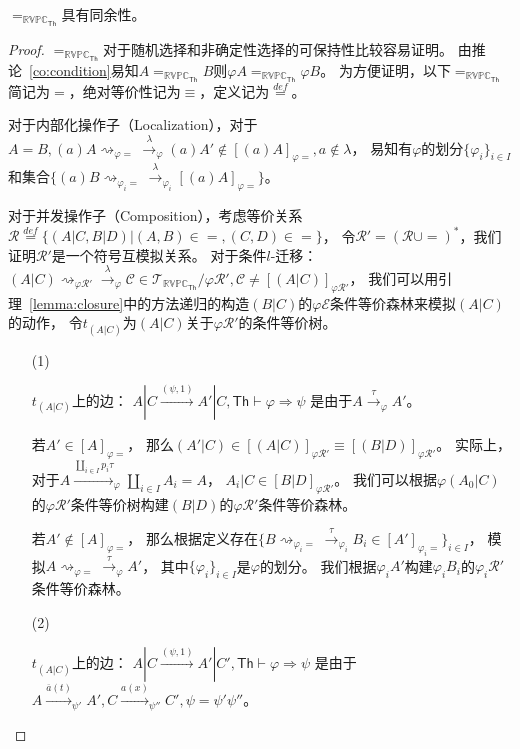 \begin{theorem}
   $=_{\mathbb{RVPC}_{\mathsf{Th}}}$具有同余性。
\end{theorem}
\begin{proof}
   $=_{\mathbb{RVPC}_{\mathsf{Th}}}$对于随机选择和非确定性选择的可保持性比较容易证明。
   由推论~\ref{co:condition}易知$A=_{\mathbb{RVPC}_{\mathsf{Th}}}B$则$\varphi A=_{\mathbb{RVPC}_{\mathsf{Th}}}\varphi B$。
   为方便证明，以下$=_{\mathbb{RVPC}_{\mathsf{Th}}}$简记为$=$，绝对等价性记为$\equiv$，定义记为$\stackrel{def}{=}$。
   
   对于内部化操作子（Localization），对于$A=B,(a)A\rightsquigarrow_{\varphi=}\stackrel{\lambda}{\rightarrow}_{\varphi} (a)A'\notin [(a)A]_{\varphi =}, a\notin \lambda$，
   易知有$\varphi$的划分$\{\varphi_i\}_{i\in I}$和集合$\{(a)B\rightsquigarrow_{\varphi_i=}\stackrel{\lambda}{\rightarrow}_{\varphi_i}[(a)A]_{\varphi =}\}$。

   对于并发操作子（Composition），考虑等价关系$\mathcal{R}\stackrel{def}{=}\{(A|C,B|D)|(A,B)\in =,(C,D)\in =\}$，
   令$\mathcal{R}' = (\mathcal{R}\cup =)^*$，我们证明$\mathcal{R}'$是一个符号互模拟关系。
   对于条件$l$-迁移：$(A|C)\rightsquigarrow_{\varphi\mathcal{R'}}\stackrel{\lambda}{\rightarrow}_{\varphi}\mathcal{C}\in\mathcal{T}_{\mathbb{RVPC}_{\mathsf{Th}}}/\varphi \mathcal{R}',\mathcal{C}\neq [(A|C)]_{\varphi\mathcal{R}'}$，
   我们可以用引理~\ref{lemma:closure}中的方法递归的构造$(B|C)$的$\varphi\mathcal{E}$条件等价森林来模拟$(A|C)$的动作，
   令$t_{(A|C)}$为$(A|C)$关于$\varphi\mathcal{R'}$的条件等价树。
   \begin{itemize}
      \item[(1)] {
         $t_{(A|C)}$上的边：
         $A|C\stackrel{(\psi, 1)}{\rightarrow} A'|C, \mathsf{Th}\vdash \varphi\Rightarrow\psi$
         是由于$A\stackrel{\tau}{\rightarrow}_{\varphi} A'$。

         若$A'\in [A]_{\varphi =}$，
         那么$(A'|C)\in[(A|C)]_{\varphi\mathcal{R}'}\equiv[(B|D)]_{\varphi\mathcal{R}'}$。
         实际上，对于$A\stackrel{\coprod_{i\in I}p_i\tau}{\rightarrow}_{\varphi} \coprod_{i\in I} A_i=A$，
         $A_i|C\in [B|D]_{\varphi\mathcal{R}'}$。
         我们可以根据$\varphi (A_0|C)$的$\varphi\mathcal{R}'$条件等价树构建$(B|D)$的$\varphi\mathcal{R}'$条件等价森林。

         若$A'\notin [A]_{\varphi =}$，
         那么根据定义存在$\{B\rightsquigarrow_{\varphi_i\mathcal{=}}\stackrel{\tau}{\rightarrow}_{\varphi_i}B_i\in [A']_{\varphi_i =}\}_{i\in I}$，
         模拟$A\rightsquigarrow_{\varphi =}\stackrel{\tau}{\rightarrow}_{\varphi} A'$，
         其中$\{\varphi_i\}_{i\in I}$是$\varphi$的划分。
         我们根据$\varphi_i A'$构建$\varphi_i B_i$的$\varphi_i \mathcal{R}'$条件等价森林。
      }
      \item[(2)] {
         $t_{(A|C)}$上的边：
         $A|C\stackrel{(\psi, 1)}{\rightarrow} A'|C', \mathsf{Th}\vdash \varphi\Rightarrow\psi$
         是由于$A\stackrel{\overline{a}(t)}{\longrightarrow}_{\psi'} A', C\stackrel{a(x)}{\longrightarrow}_{\psi''} C', \psi=\psi'\psi''$。

}
\end{itemize}
\end{proof}
